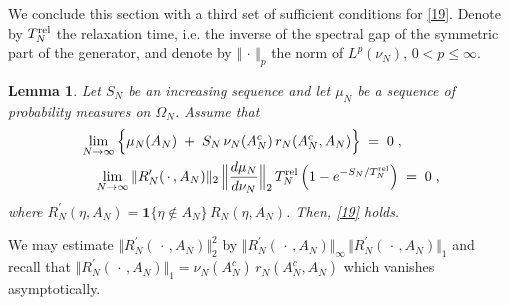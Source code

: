 \documentclass[reqno]{amsart}
\newtheorem{lemma}[theorem]{Lemma}
\begin{document}
We conclude this section with a third set of sufficient conditions
for \eqref{19}. Denote by $T^{\rm rel}_N$ the relaxation time, i.e.
the inverse of the spectral gap of the symmetric part of the
generator, and denote by $\Vert\,\cdot\,\Vert_p$ the norm of $L^p(\nu_N)$,
$0<p\le \infty$.

\begin{lemma}
\label{s15}
Let $S_N$ be an increasing sequence and let $\mu_N$ be a sequence of
probability measures on $\Omega_N$. Assume that
\begin{equation*}
\begin{split}
& \lim_{N\to\infty} \Big\{ \mu_N(A_N) \;+\; S_N\, 
\nu_N (A_N^c)\, r_N(A_N^c, A_N) \Big\}\;=\; 0\;, \\
&\quad  
\lim_{N\to\infty} \Vert R^\prime_N( \,\cdot\,, A_N) \Vert_2 \, 
\Big\Vert \frac{d\mu_N}{d\nu_N} \Big\Vert_{2} 
\, T^{\rm rel}_N\, \Big( 1 - e^{-S_N/T^{\rm rel}_N} \Big) \;=\; 0\;,
\end{split}
\end{equation*}
where $R^\prime_N(\eta, A_N) = {{\mathbf 1}}\{\eta \not\in A_N\} \, R_N(\eta,
A_N)$. Then, \eqref{19} holds.
\end{lemma}

We may estimate $\Vert R^\prime_N( \,\cdot\,, A_N) \Vert^2_2$ by
$\Vert R^\prime_N( \,\cdot\,, A_N) \Vert_\infty \, \Vert R^\prime_N(
\,\cdot\,, A_N) \Vert_1$ and recall that $\Vert R^\prime_N( \,\cdot\,,
A_N) \Vert_1 = \nu_N (A_N^c)\, r_N(A_N^c, A_N)$ which vanishes
asymptotically.
\end{document}
